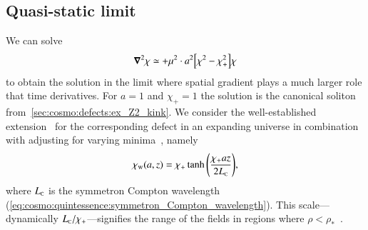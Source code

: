 

\subsection{Quasi-static limit}\label{sec:PT:symm_dws:quasi-static}
    We can solve
    \begin{equation}\label{eq:PT:symm_dws:eom_chi_quasistatic}
        \boldsymbol{\nabla}^2 \chi \simeq  +\mu^2 
         \cdot a^2{\left[  \chi^2 - \chi_+^2  \right]}\chi
    \end{equation}
    to obtain the solution in the limit where spatial gradient plays a much larger role that time derivatives. For $a=1$ and $\chi_+=1$ the solution is the canonical soliton from~\cref{sec:cosmo:defects:ex_Z2_kink}. 
    We consider the well-established extension~\citep[see e.g.][]{pressDynamicalEvolutionDomain1989} for the corresponding defect in an expanding universe in combination with adjusting for varying minima~\citep{llinaresDomainWallsCoupled2014}, namely
    \begin{equation}\label{eq:PT:symm_dws:chi_w_quasistatic_FLRW} 
        \chi_\mathrm{w}(a, z) = \chi_+ \tanh{{\left(  \frac{ \chi_+ az}{2L_{\text{\tiny{C}}}}   \right)}},
    \end{equation}
    where $L_{\text{\tiny{C}}}$ is the symmetron Compton wavelength (\cref{eq:cosmo:quintessence:symmetron_Compton_wavelength}). This scale---dynamically $L_{\text{\tiny{C}}}/\chi_+$---signifies the range of the fields in regions where $\rho < \rho_\ast$~\citep{perivolaropoulosGravitationalTransitionsExplicitly2022}. %

